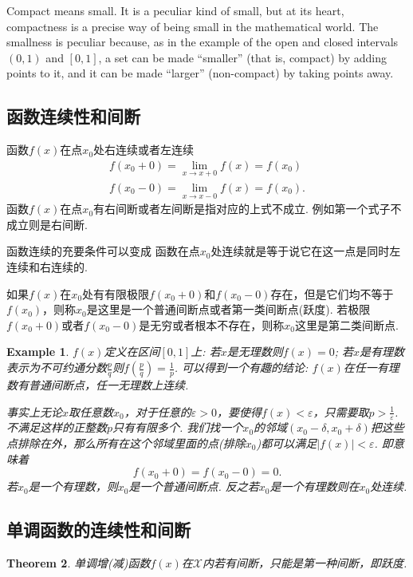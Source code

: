 \documentclass{article}
\newtheorem{theorem}{Theorem}[section]
\newtheorem{example}[theorem]{Example}
\begin{document}
Compact means small. It is a peculiar kind of small, but at its heart, compactness is a precise way of being small in the mathematical world. The smallness is peculiar because, as in the example of the open and closed intervals $(0,1)$ and $[0,1]$, a set can be made “smaller” (that is, compact) by adding points to it, and it can be made “larger” (non-compact) by taking points away.

\newpage
\subsection{函数连续性和间断}

函数$f(x)$在点$x_0$处右连续或者左连续
\begin{align}
f(x_0+0) = \lim\limits_{x \rightarrow x+0} f(x) = f(x_0) \\
f(x_0-0) = \lim\limits_{x \rightarrow x-0} f(x) = f(x_0).
\end{align}
函数$f(x)$在点$x_0$有右间断或者左间断是指对应的上式不成立. 例如第一个式子不成立则是右间断.

函数连续的充要条件可以变成{\color{blue} 函数在点$x_0$处连续就是等于说它在这一点是同时左连续和右连续的}.

如果$f(x)$在$x_0$处有有限极限$f(x_0+0)$和$f(x_0-0)$存在，但是它们均不等于$f(x_0)$，则称$x_0$是这里是一个普通间断点或者第一类间断点(跃度). 若极限$f(x_0+0)$或者$f(x_0-0)$是无穷或者根本不存在，则称$x_0$这里是第二类间断点.

\begin{example}
$f(x)$定义在区间$[0,1]$上: 若$x$是无理数则$f(x)=0$; 若$x$是有理数表示为不可约通分数$\frac{p}{q}$则$f(\frac{p}{q})=\frac{1}{p}$. 可以得到一个有趣的结论: $f(x)$在任一有理数有普通间断点，任一无理数上连续.

\rm 事实上无论$x$取任意数$x_0$，对于任意的$\varepsilon > 0$，要使得$f(x) < \varepsilon$，只需要取$p > \frac{1}{\varepsilon}$. 不满足这样的正整数$p$只有有限多个. 我们找一个$x_0$的邻域$(x_0-\delta,x_0+\delta)$把这些点排除在外，那么所有在这个邻域里面的点(排除$x_0$)都可以满足$|f(x)| < \varepsilon$. 即意味着
$$
f(x_0 + 0) = f(x_0 - 0) = 0.
$$
若$x_0$是一个有理数，则$x_0$是一个普通间断点. 反之若$x_0$是一个有理数则在$x_0$处连续.
\end{example}

\newpage
\subsection{单调函数的连续性和间断}

\begin{theorem}
\rm 单调增(减)函数$f(x)$在$\mathcal{X}$内若有间断，只能是第一种间断，即跃度.
\end{theorem}
\end{document}
